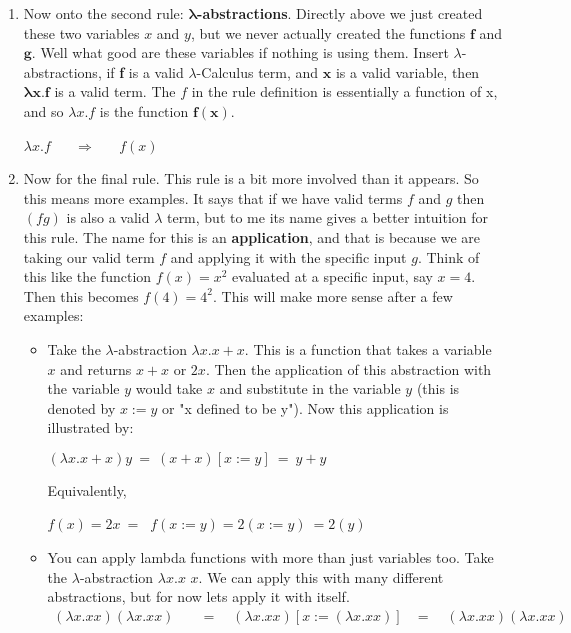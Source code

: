 \documentclass[12pt]{article}
\begin{document}
\begin{enumerate}
\item Now onto the second rule: $\boldsymbol{\lambda}$\textbf{-abstractions}. Directly above we just created these two variables $x$ and $y$, but we never actually created the functions $\mathbf{f}$ and $\mathbf{g}$. Well what good are these variables if nothing is using them. Insert $\lambda$-abstractions, if \textbf{f} is a valid $\lambda$-Calculus term, and $\mathbf{x}$ is a valid variable, then $\boldsymbol{\lambda}\mathbf{x. f}$ is a valid term. The $f$ in the rule definition is essentially a function of x, and so $\lambda x.f$ is the function $\mathbf{f(x)}$. 
\begin{center}
$\lambda x.f$ $\quad$ $\Rightarrow$ $\quad$ $f(x)$ 
\end{center}

\item Now for the final rule. This rule is a bit more involved than it appears. So this means more examples. It says that if we have valid terms $f$ and $g$ then $(fg)$ is also a valid $\lambda$ term, but to me its name gives a better intuition for this rule. The name for this is an \textbf{application}, and that is because we are taking our valid term $f$ and applying it with the specific input $g$. Think of this like the function $f(x) = x^2$ evaluated at a specific input, say $x=4$. Then this becomes $f(4) = 4^2$. This will make more sense after a few examples:
\begin{itemize}
\item Take the $\lambda$-abstraction $\lambda x.x + x$. This is a function that takes a variable $x$ and returns $x+x$ or $2x$. Then the application of this abstraction with the variable $y$ would take $x$ and substitute in the variable $y$ (this is denoted by $x:=y$ or "x defined to be y"). Now this application is illustrated by: 
\begin{center}
$(\lambda x.x + x)y \ = \ (x + x)[x:=y] \ = \ y + y$
\end{center}
Equivalently,
\begin{center}
$f(x) = 2x \ = \ $  $f(x:=y) = 2(x:=y) \ = 2(y)$
\end{center}
\item You can apply lambda functions with more than just variables too. Take the $\lambda$-abstraction $\lambda x.x$ $x$. We can apply this with many different abstractions, but for now lets apply it with itself. 
\begin{align*}
(\lambda x.x x) (\lambda x.x x)\quad &= \quad (\lambda x.x x) [x := (\lambda x.x x)]
&= \quad (\lambda x.x x) (\lambda x.x x)

\end{align*}
\end{itemize}
\end{enumerate}
\end{document}
